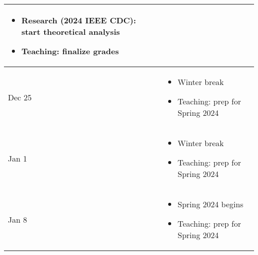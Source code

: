 \documentclass{article}
\begin{document}
\begin{center}
\begin{xltabular}{\linewidth}{ s | M }
\begin{itemize}
\item 
Research (2024 IEEE CDC): start theoretical analysis
\item 
Teaching: finalize grades
\end{itemize}
\\
\hline
Dec 25 	&
\begin{itemize}
\item 
Winter break
\item 
Teaching: prep for Spring 2024
\end{itemize}
\\
\hline
Jan 1 	&
\begin{itemize}
\item 
Winter break
\item 
Teaching: prep for Spring 2024
\end{itemize}
\\
\hline
Jan 8 	&
\begin{itemize}
\item 
Spring 2024 begins
\item 
Teaching: prep for Spring 2024
\end{itemize}
\\
\end{xltabular}
\end{center}
\end{document}

